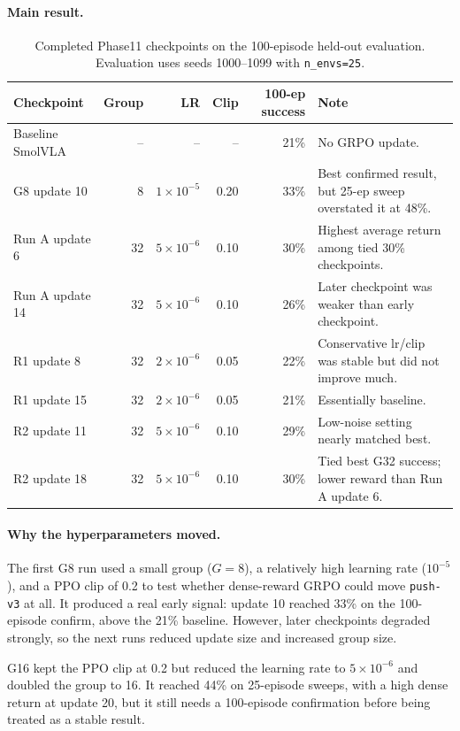 \paragraph{Main result.}
\begin{table}[h]
\centering
\small
\begin{tabular}{lrrrrl}
\toprule
Checkpoint & Group & LR & Clip & 100-ep success & Note \\
\midrule
Baseline SmolVLA & -- & -- & -- & 21\% & No GRPO update. \\
G8 update 10 & 8 & $1{\times}10^{-5}$ & 0.20 & 33\% & Best confirmed result, but 25-ep sweep overstated it at 48\%. \\
Run A update 6 & 32 & $5{\times}10^{-6}$ & 0.10 & 30\% & Highest average return among tied 30\% checkpoints. \\
Run A update 14 & 32 & $5{\times}10^{-6}$ & 0.10 & 26\% & Later checkpoint was weaker than early checkpoint. \\
R1 update 8 & 32 & $2{\times}10^{-6}$ & 0.05 & 22\% & Conservative lr/clip was stable but did not improve much. \\
R1 update 15 & 32 & $2{\times}10^{-6}$ & 0.05 & 21\% & Essentially baseline. \\
R2 update 11 & 32 & $5{\times}10^{-6}$ & 0.10 & 29\% & Low-noise setting nearly matched best. \\
R2 update 18 & 32 & $5{\times}10^{-6}$ & 0.10 & 30\% & Tied best G32 success; lower reward than Run A update 6. \\
\bottomrule
\end{tabular}
\caption{Completed Phase11 checkpoints on the 100-episode held-out evaluation.  Evaluation uses seeds 1000--1099 with \texttt{n\_envs=25}.}
\label{tab:phase11-100ep-results}
\end{table}

\paragraph{Why the hyperparameters moved.}
The first G8 run used a small group ($G=8$), a relatively high learning rate ($10^{-5}$), and a PPO clip of 0.2 to test whether dense-reward GRPO could move \texttt{push-v3} at all.  It produced a real early signal: update 10 reached 33\% on the 100-episode confirm, above the 21\% baseline.  However, later checkpoints degraded strongly, so the next runs reduced update size and increased group size.

G16 kept the PPO clip at 0.2 but reduced the learning rate to $5{\times}10^{-6}$ and doubled the group to 16.  It reached 44\% on 25-episode sweeps, with a high dense return at update 20, but it still needs a 100-episode confirmation before being treated as a stable result.

